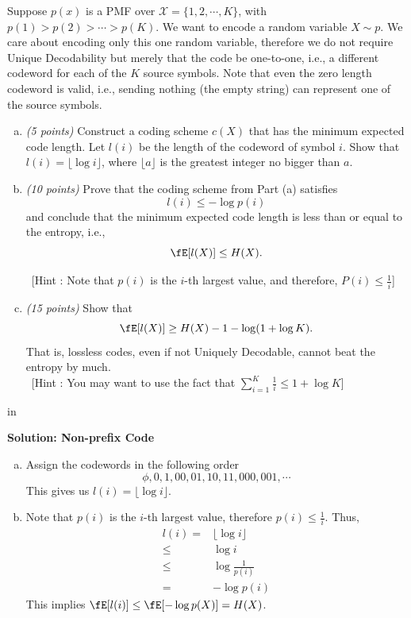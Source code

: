 \documentclass[12pt]{article}
\begin{document}
\begin{enumerate}
Suppose $p(x)$ is a PMF over $\mathcal{X} = \{1,2,\cdots,K\}$, with $p(1) > p(2)>\cdots > p(K)$. We want to encode a random variable $X\sim p$. We care about encoding only this one random variable, therefore we do not require Unique Decodability but merely that the code be one-to-one, i.e., a different codeword for each of the $K$ source symbols. Note that even the zero length codeword is valid, i.e., sending nothing (the empty string) can represent one of the source symbols.
\begin{enumerate}[(a)]
\item {\it (5 points)} Construct a coding scheme $c(X)$ that has the minimum expected code length. Let $l(i)$ be the length of the codeword of symbol $i$. Show that $l(i)= \lfloor \log i \rfloor$, where $\lfloor a \rfloor$ is the greatest integer no bigger than $a$.

\item {\it (10 points)} Prove that the coding scheme from Part (a) satisfies  
\[l(i) \leq -\log p(i)\]
and conclude that the minimum expected code length is less than or equal to the entropy, i.e.,
\[\fE[l(X)]\leq H(X).\]

~[Hint : Note that $p(i)$ is the $i$-th largest value, and therefore, $P(i) \leq \frac{1}{i}$]

\item {\it (15 points)} Show that
\[\fE[l(X)] \geq H(X)-1-\log(1+\log K ).\]
That is, lossless codes, even if not Uniquely Decodable, cannot beat the entropy by much.\\

~[Hint : You may want to use the fact that $\sum_{i=1}^K \frac{1}{i}\leq 1+\log K$]


\end{enumerate}

 in
\begin{solution}{\bf Solution: Non-prefix Code}\\
\begin{enumerate}[(a)]
\item Assign the codewords in the following order
\[\phi,0,1,00,01,10,11,000,001,\cdots\]
This gives us $l(i)=\lfloor \log i\rfloor$.

\item Note that $p(i)$ is the $i$-th largest value, therefore $p(i) \leq \frac{1}{i}$. Thus,
\begin{align*}
l(i) =& \lfloor \log i \rfloor\\
\leq &\log i\\
\leq &\log \frac{1}{p(i)}\\
=& -\log p(i)
\end{align*}
This implies $\fE[l(i)] \leq \fE[-\log p(X)] = H(X)$.


\end{enumerate}
\end{solution}
\end{enumerate}
\end{document}
